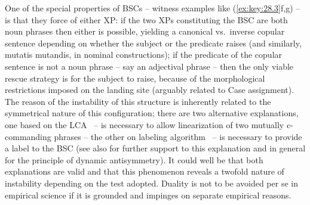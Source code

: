 \documentclass[output=paper]{langsci/langscibook}
\begin{document}
One of the special properties of \glspl{BSC} – witness
examples like (\ref{ex:key:28.3}f,g) -- is that they force  of either XP: if the two XPs constituting the \gls{BSC}
are both noun phrases then either  is possible, yielding a canonical
vs.\ inverse copular sentence depending on whether the subject or the predicate
raises (and similarly, mutatis mutandis, in nominal constructions); if
the predicate of the copular sentence is not a noun phrase -- say an adjectival
phrase -- then the only viable rescue strategy is for the subject to raise,
because of the morphological restrictions imposed on the landing site (arguably
related to Case assignment). The reason of the instability of this structure is
inherently related to the symmetrical nature of this configuration; there are
two alternative explanations, one based on the \gls{LCA} \citep{Moro2000}~– 
is necessary to allow linearization of two mutually c-commanding phrases -- the
other on labeling algorithm \citep{Moro2009}~–  is necessary to provide
a label to the \gls{BSC} (see also
\citealt{Moro2000,Moro2009,Chomsky2013,Chomsky2017,ChoGalOtt2019,Rizzi2015,Rizzi2016}
for further support to this explanation and in general for the principle of
dynamic antisymmetry). It could well be that both explanations are valid and
that this phenomenon reveals a twofold nature of instability depending on the
test adopted. Duality is not to be avoided per se in empirical science
if it is grounded and impinges on separate empirical reasons.
\end{document}
